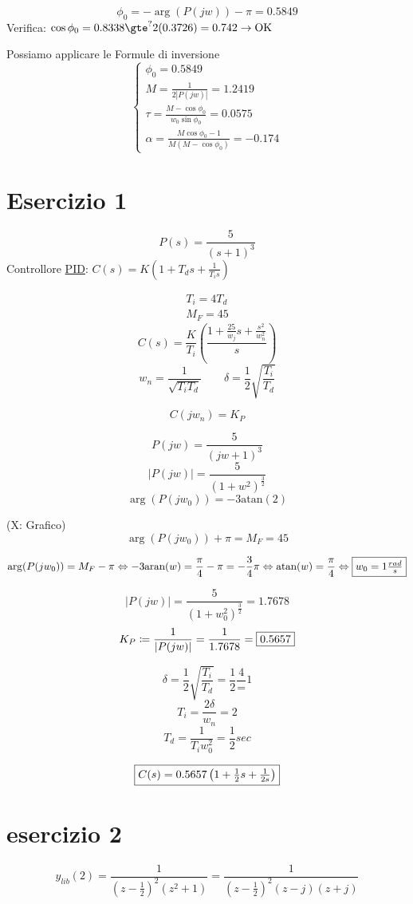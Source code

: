 \documentclass{article}
\begin{document}
\[ \phi_0 = -\arg(P(jw)) - \pi = 0.5849 \]
Verifica: $\cos \phi_0 = 0.8338 \gte^? 2(0.3726) = 0.742 \rightarrow \text{OK}$

Possiamo applicare le Formule di inversione
\[
\begin{cases}
    \phi_0 = 0.5849\\
    M = \frac{1}{2|P(jw)|} = 1.2419\\
    \tau = \frac{M - \cos\phi_0}{w_0 \sin \phi_0} = 0.0575\\
    \alpha = \frac{M\cos\phi_0 -1} {M(M - \cos \phi_0)} = - 0.174
\end{cases}
\]

\section{Esercizio 1}

\[ P(s) = \frac{5}{(s+1)^3} \]
Controllore \underline{PID}: $ C(s) = K\left(1 + T_d s + \frac{1}{T_i s}\right)$

\[
\begin{split}
    T_i = 4T_d\\
    M_F = 45
\end{split}
\]
\[ C(s) = \frac{K}{T_i}\left( \frac{1 + \frac{25}{w_j}s + \frac{s^2}{w_n^2}}{s}\right)\]
\[ w_n = \frac{1}{\sqrt{T_iT_d}} \qquad \delta = \frac{1}{2}\sqrt{\frac{T_i}{T_d}} \]

\[ C(jw_n) = K_P \]

\[ P(jw) = \frac{5}{(jw+1)^3} \]
\[ |P(jw)| = \frac{5}{(1 + w^2) ^{\frac{3}{2}}} \]
\[ \arg(P(jw_0)) = -3 \text{atan}(2) \]

%
(X: Grafico)
\[ \arg(P(jw_0)) + \pi = M_F = 45 \]

\[ \arg(P(jw_0)) = M_F - \pi \Leftrightarrow -3 \text{aran}(w) = \frac{\pi}{4} - \pi = -\frac{3}{4}\pi \Leftrightarrow \text{atan}(w) = \frac{\pi}{4} \Leftrightarrow \framebox{$w_0 = 1 \frac{rad}{s}$}\]

\[ |P(jw)| = \frac{5}{(1 + w_0^2)^{\frac{3}{2}}} = 1.7678 \]
\[ K_P \coloneqq \frac{1}{|P(jw)|} = \frac{1}{1.7678} = \framebox{$0.5657$} \]

\[ \delta = \frac{1}{2}\sqrt{\frac{T_i}{T_d}} = \frac{1}{2}\frac{4} = 1 \]
\[ T_i = \frac{2\delta}{w_n} = 2 \]
\[ T_d = \frac{1}{T_i w_0^2} = \frac{1}{2} sec \]

\[\framebox{$C(s) = 0.5657 \left( 1 + \frac{1}{2}s + \frac{1}{2s}\right) $}\]

\section{esercizio 2}
\[ y_{lib}(2) = \frac{1}{(z - \frac{1}{2}) ^2 (z^2 + 1)}  = \frac{1}{\left(z - \frac{1}{2}\right)^2(z -j)(z + j)} \]
\end{document}

